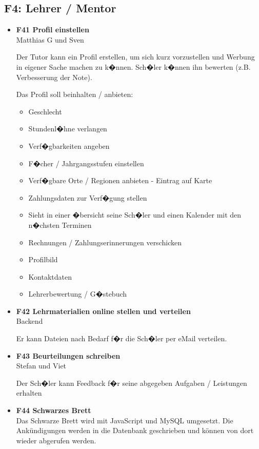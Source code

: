 \documentclass[10pt,a4paper]{scrartcl}
\begin{document}
\subsection{F4: Lehrer / Mentor}
\begin{itemize}
\item[] \textbf{F41 Profil einstellen}\\

Matthias G und Sven

Der Tutor kann ein Profil erstellen, um sich kurz vorzustellen und Werbung in eigener Sache machen zu k�nnen. Sch�ler k�nnen ihn bewerten (z.B. Verbesserung der Note).

Das Profil soll beinhalten / anbieten:
\begin{itemize}
	\item Geschlecht
	\item Stundenl�hne verlangen
	\item Verf�gbarkeiten angeben
	\item F�cher / Jahrgangsstufen einstellen
	\item Verf�gbare Orte / Regionen anbieten - Eintrag auf Karte
	\item Zahlungsdaten zur Verf�gung stellen
	\item Sieht in einer �bersicht seine Sch�ler und einen Kalender mit den n�chsten Terminen
	\item Rechnungen / Zahlungserinnerungen verschicken
	\item Profilbild
	\item Kontaktdaten
	\item Lehrerbewertung / G�stebuch
\end{itemize}

\item[] \textbf{F42 Lehrmaterialien online stellen und verteilen}\\

Backend

Er kann Dateien nach Bedarf f�r die Sch�ler per eMail verteilen.

\item[] \textbf{F43 Beurteilungen schreiben}\\

Stefan und Viet

Der Sch�ler kann Feedback f�r seine abgegeben Aufgaben / Leistungen erhalten

\item[] \textbf{F44 Schwarzes Brett}\\

Das Schwarze Brett wird mit JavaScript und MySQL umgesetzt. 
Die Ankündigungen werden in die Datenbank geschrieben und können von dort wieder abgerufen werden. 
\end{itemize}

\end{document}
